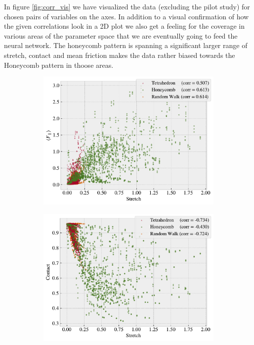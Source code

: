 In figure \ref{fig:corr_vis} we have visualized the data (excluding the pilot study) for chosen pairs of variables on the axes. In addition to a visual confirmation of how the given correlations look in a 2D plot we also get a feeling for the coverage in various areas of the parameter space that we are eventually going to feed the neural network. The honeycomb pattern is spanning a significant larger range of stretch, contact and mean friction makes the data rather biased towards the Honeycomb pattern in thoose areas. 

\begin{figure}[H]
  \centering
  \begin{subfigure}[t]{0.49\textwidth}
      \centering
      \includegraphics[width=\textwidth]{figures/ML/corr_stretch_Ff.pdf}
      \caption{}
  \end{subfigure}
  \hfill
  \begin{subfigure}[t]{0.49\textwidth}
      \centering
      \includegraphics[width=\textwidth]{figures/ML/corr_stretch_contact.pdf}

\end{subfigure}
\end{figure}
